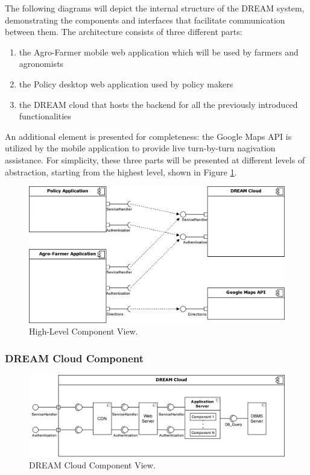 The following diagrams will depict the internal structure of the DREAM system, demonstrating the components and interfaces that facilitate communication between them. The architecture consists of three different parts:
\begin{enumerate}
	\item the Agro-Farmer mobile web application which will be used by farmers and agronomists
	\item the Policy desktop web application used by policy makers
	\item the DREAM cloud that hosts the backend for all the previously introduced functionalities
\end{enumerate}
An additional element is presented for completeness: the Google Maps API is utilized by the mobile application to provide live turn-by-turn nagivation assistance. For simplicity, these three parts will be presented at different levels of abstraction, starting from the highest level, shown in Figure \ref{fig:highLevelComp}.\\

\begin{figure}[hbt!]
\centering
\includegraphics[width=\textwidth]{../images_diagrams/dd/high_level_cloud.png}
\caption{High-Level Component View.}
\label{fig:highLevelComp}
\end{figure}

\subsubsection{DREAM Cloud Component} \label{sect:cloudComponent}

\begin{figure}[hbt!]
\centering
\includegraphics[width=\textwidth]{../images_diagrams/dd/component_only_cloud.png}
\caption{DREAM Cloud Component View.}
\label{fig:CloudOnlyComp}
\end{figure}

